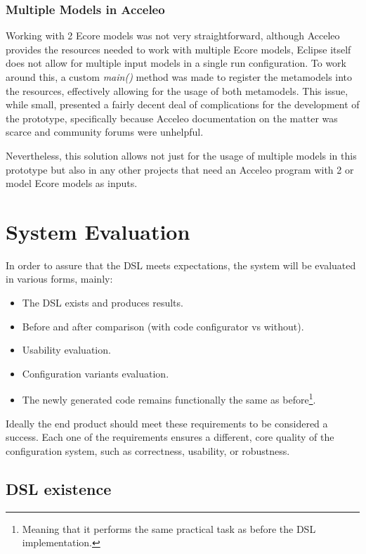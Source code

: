 \subsubsection{Multiple Models in Acceleo}

Working with 2 Ecore models was not very straightforward, although Acceleo provides the resources needed to work with multiple Ecore models, Eclipse itself does not allow for multiple input models in a single run configuration. To work around this, a custom \textit{main()} method was made to register the metamodels into the resources, effectively allowing for the usage of both metamodels. This issue, while small, presented a fairly decent deal of complications for the development of the prototype, specifically because Acceleo documentation on the matter was scarce and community forums were unhelpful.

Nevertheless, this solution allows not just for the usage of multiple models in this prototype but also in any other projects that need an Acceleo program with 2 or model Ecore models as inputs.


\section{System Evaluation}
\label{sec:sys_eval}

In order to assure that the \gls{DSL} meets expectations, the system will be evaluated in various forms, mainly:

\begin{itemize}
	\item The \gls{DSL} exists and produces results.
	\item Before and after comparison (with code configurator vs without).
	\item Usability evaluation.
	\item Configuration variants evaluation.
	\item The newly generated code remains functionally the same as before\footnote{Meaning that it performs the same practical task as before the \gls{DSL} implementation.}.
\end{itemize}

Ideally the end product should meet these requirements to be considered a success. Each one of the requirements ensures a different, core quality of the configuration system, such as correctness, usability, or robustness.

\subsection*{DSL existence}

